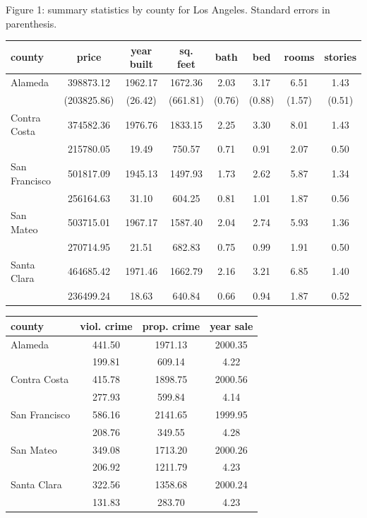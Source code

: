 \documentclass[12pt,a4paper]{article}
\begin{document}
\begin{center}
Figure 1: summary statistics by county for Los Angeles. Standard errors in parenthesis.
\end{center}

\begin{center}
\begin{tabular}{lccccccc}
\hline
\hline
county  &          price &   year built &      sq. feet &      bath &       bed &     rooms &   stories \\
\hline
\hline
Alameda &  398873.12 &     1962.17 &  1672.36 &  2.03 &  3.17 &   6.51 &     1.43  \\
      &  (203825.86) &       (26.42) &   (661.81) &  (0.76) &  (0.88) &   (1.57) &     (0.51) \\
\hline
Contra Costa    &  374582.36 &     1976.76 &  1833.15 &  2.25 &  3.30 &   8.01 &     1.43 \\
   &  215780.05 &       19.49 &   750.57 &  0.71 &  0.91 &   2.07 &     0.50  \\
\hline
San Francisco     &  501817.09 &     1945.13 &  1497.93 &  1.73 &  2.62 &   5.87 &     1.34 \\
   &  256164.63 &       31.10 &   604.25 &  0.81 &  1.01 &   1.87 &     0.56  \\
\hline
San Mateo     &  503715.01 &     1967.17 &  1587.40 &  2.04 &  2.74 &   5.93 &     1.36 \\
    &  270714.95 &       21.51 &   682.83 &  0.75 &  0.99 &   1.91 &     0.50  \\
\hline
Santa Clara     &  464685.42 &     1971.46 &  1662.79 &  2.16 &  3.21 &   6.85 &     1.40  \\
     &  236499.24 &       18.63 &   640.84 &  0.66 &  0.94 &   1.87 &     0.52 \\
\hline
\hline
\end{tabular}
\vspace{1cm}

\begin{tabular}{lccc}
\hline
\hline
county  &    viol. crime &  prop. crime &    year sale \\
\hline
\hline
Alameda &         441.50 &         1971.13 &    2000.35 \\
&         199.81 &          609.14 &       4.22\\
\hline
Contra Costa    &         415.78 &       1898.75 &    2000.56\\
&         277.93 &          599.84 &       4.14\\
\hline
San Francisco    &  586.16 &         2141.65 &    1999.95 \\
&         208.76 &          349.55 &       4.28\\
\hline
San Mateo    &         349.08 &         1713.20 &    2000.26 \\
&         206.92 &         1211.79 &       4.23\\
\hline
Santa Clara      &    322.56 &         1358.68 &    2000.24 \\
&        131.83 &          283.70 &       4.23\\
\hline
\hline
\end{tabular}
\vspace{0.4cm}


\end{center}
\end{document}
